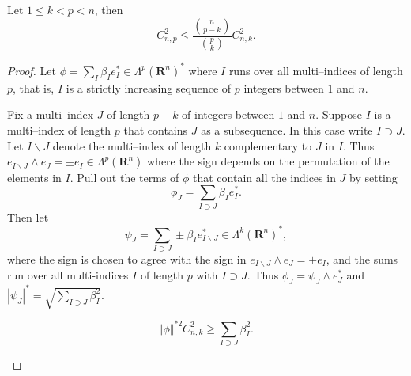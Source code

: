 \documentclass[10pt,a4paper]{amsart}
\begin{document}
\begin{proposition}\label{p:i2}%
Let $1\leq k<p<n$, then
\begin{equation*}
C_{n,p}^2 \leq \frac {\binom{n}{p-k}}{\binom{p}{k}} C_{n,k}^2.
\end{equation*}
\end{proposition}

\begin{proof}
Let $\phi = \sum_{I} \beta_I e_I^\ast  \in \Lambda^p(\mathbf{R}^n)^\ast$ where $I$ runs over all multi--indices of length $p$, that is, $I$ is a strictly increasing sequence of $p$ integers between $1$ and $n$.

Fix a multi--index $J$ of length $p-k$ of integers between $1$ and
$n$. Suppose $I$ is a multi--index of length $p$ that contains $J$ as
a subsequence.  In this case write $I \supset J$. Let $I\backslash J$
denote the multi--index of length $k$ complementary to $J$ in
$I$. Thus $e_{I\backslash J} \wedge e_J = \pm e_I \in
\Lambda^p(\mathbf{R}^n)$ where the sign depends on the permutation of
the elements in $I$. Pull out the terms of $\phi$ that contain all the
indices in $J$ by setting
\begin{equation*}
\phi_J  =  \sum_{I\supset J}  \beta_I e_I^\ast.
\end{equation*}
Then let
\begin{equation*}
\psi_J = \sum_{I\supset J} \pm \beta_I e^\ast_{I\backslash J} \in \Lambda^k(\mathbf{R}^n)^\ast,
\end{equation*}
 where  the sign is chosen to agree with the sign in $e_{I\backslash J} \wedge e_J = \pm e_I$, and the sums run over all multi-indices $I$ of length $p$ with $I \supset J$.
 Thus $\phi_J = \psi_J\wedge e_J^\ast$ and $ | \psi_J|^\ast =  \sqrt{\sum_{I \supset J} \beta_I^2}$.
 
 \begin{lemma}%
 \begin{equation}\label{e:i2}
   \Vert \phi\Vert^{\ast2} C_{n,k}^2 \geq\sum_{I \supset J} \beta_I^2.
  \end{equation}
 \end{lemma}
 

\end{proof}
\end{document}
